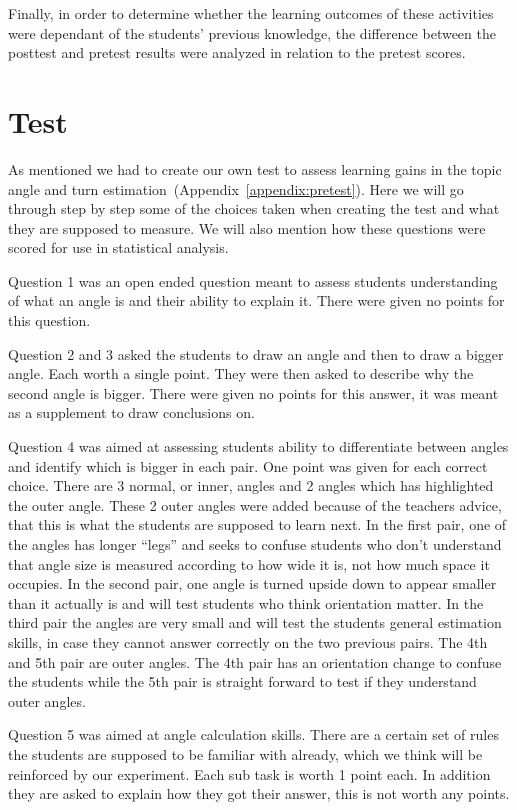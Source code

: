\bigskip\noindent
Finally, in order to determine whether the learning outcomes of these activities were dependant of the students’ previous knowledge, the difference between the posttest and pretest results were analyzed in relation to the pretest scores.

\section{Test}
As mentioned we had to create our own test to assess learning gains in the topic angle and turn estimation~(Appendix~\ref{appendix:pretest}). Here we will go through step by step some of the choices taken when creating the test and what they are supposed to measure. We will also mention how these questions were scored for use in statistical analysis. 

\bigskip\noindent
Question 1 was an open ended question meant to assess students understanding of what an angle is and their ability to explain it. There were given no points for this question.

\bigskip\noindent
Question 2 and 3 asked the students to draw an angle and then to draw a bigger angle. Each worth a single point. They were then asked to describe why the second angle is bigger. There were given no points 
for this answer, it was meant as a supplement to draw conclusions on.

\bigskip\noindent
Question 4 was aimed at assessing students ability to differentiate between angles and identify which is bigger in each pair. One point was given for each correct choice. There are 3 normal, or inner, angles and 2 angles which has highlighted the outer angle. These 2 outer angles were added because of the teachers advice, that this is what the students are supposed to learn next. In the first pair, one of the angles has longer ``legs'' and seeks to confuse students who don't understand that angle size is measured according to how wide it is, not how much space it occupies. In the second pair, one angle is turned upside down to appear smaller than it actually is and will test students who think orientation matter. In the third pair the angles are very small and will test the students general estimation skills, in case they cannot answer correctly on the two previous pairs. The 4th and 5th pair are outer angles. The 4th pair has an orientation change to confuse the students while the 5th pair is straight forward to test if they understand outer angles. 

\bigskip\noindent
Question 5 was aimed at angle calculation skills. There are a certain set of rules the students are supposed to be familiar with already, which we think will be reinforced by our experiment. Each sub task is worth 1 point each. In addition they are asked to explain how they got their answer, this is not worth any points.

